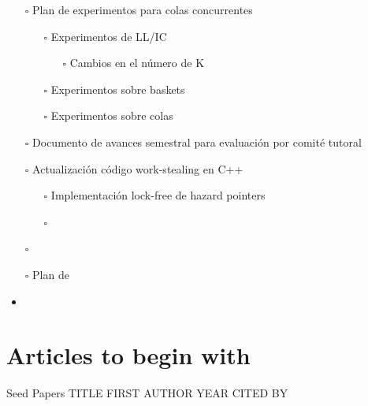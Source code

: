 \documentclass[openany, a4paper]{book}
\theoremstyle{break}
\theoremstyle{example}
\theoremstyle{note}
\theoremstyle{break}
\theoremstyle{exercise}
\begin{document}
\begin{itemize}
\item[{$\square$}] Plan de experimentos para colas concurrentes
\begin{itemize}
\item[{$\square$}] Experimentos de LL/IC
\begin{itemize}
\item[{$\square$}] Cambios en el número de K
\end{itemize}
\item[{$\square$}] Experimentos sobre baskets
\item[{$\square$}] Experimentos sobre colas
\end{itemize}
\item[{$\square$}] Documento de avances semestral para evaluación por comité tutoral
\item[{$\square$}] Actualización código work-stealing en C++
\begin{itemize}
\item[{$\square$}] Implementación lock-free de hazard pointers
\item[{$\square$}]
\end{itemize}
\item[{$\square$}]

\item[{$\square$}] Plan de
\item
\end{itemize}

\part{Articles to begin with}
\label{sec:org7deddfe}

  Seed Papers
TITLE	FIRST AUTHOR	YEAR	CITED BY
\end{document}
